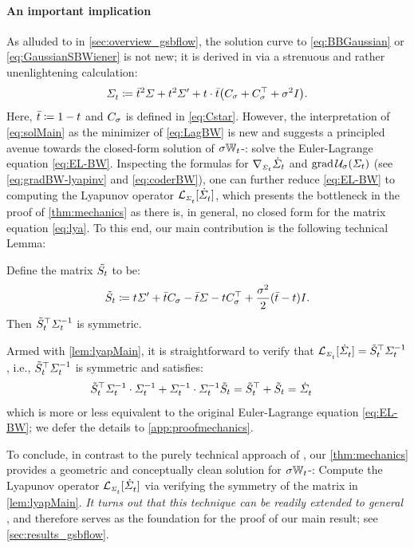 \paragraph{An important implication}As alluded to in \cref{sec:overview_gsbflow}, the solution curve to \eqref{eq:BBGaussian} or \eqref{eq:GaussianSBWiener} is not new; it is derived in \citet{mallasto2021entropy} via a strenuous and rather unenlightening calculation:
\begin{equation}
\label{eq:solMain}
\Sigmasol \defeq \ctimebar^2 \Sigma + \ctime^2 \Sigma' + \ctime\cdot\ctimebar\parens*{\C+\C^\top+ \sigma^2 \eye}.
\end{equation}
Here, $\bar{t} \coloneqq 1-t$ and $C_{\sigma}$ is defined in \eqref{eq:Cstar}. However, the interpretation of \eqref{eq:solMain} as the minimizer of \eqref{eq:LagBW} is new and suggests a principled avenue towards the closed-form solution of $\sigma\mathbb{W}_{t}$-: solve the Euler-Lagrange equation \eqref{eq:EL-BW}.
Inspecting the formulas for $\nabla_{\scriptscriptstyle\dot{\Sigma}_{t}}\dot{\Sigma}_{t}$ and $\gradBW \penergyBW$ (see \eqref{eq:gradBW-lyapinv} and \eqref{eq:coderBW}), one can further reduce \eqref{eq:EL-BW} to computing the Lyapunov operator $\lyap$, which presents the bottleneck in the proof of \cref{thm:mechanics} as there is, in general, no closed form for the matrix equation \eqref{eq:lya}. To this end, our main contribution is the following technical Lemma:
\begin{lemma}\label{lem:lyapMain}
Define the matrix $\tilde{S_{t}}$ to be:
\begin{equation}
\label{eq:HtMain}
\tilde{S}_{t} \coloneqq t\Sigma' + \bar{t} C_{\sigma} - \bar{t}\Sigma - tC_{\sigma}^\top + \frac{\sigma^2}{2}(\bar{t}-t)I.
\end{equation}Then $\tilde{S}_{t}^\top\Sigma^{-1}_{ t }$ is symmetric.
\end{lemma}
Armed with \cref{lem:lyapMain}, it is straightforward to verify that $\lyap = \Ht^\top\Sigmasolinv$, i.e., $\tilde{S}_{t}^\top \Sigma^{-1}_{ t }$ is symmetric and satisfies:
\begin{align}
   \tilde{S}_{t}^\top\Sigma^{-1}_{ t } \cdot \Sigma^{-1}_{ t } + \Sigma^{-1}_{ t } \cdot\Sigma^{-1}_{ t } \tilde{S}_{t} &= \tilde{S}_{t}^\top +  \tilde{S}_{t}= \dot{\Sigma}^{}_{ t }
\end{align}which is more or less equivalent to the original Euler-Lagrange equation \eqref{eq:EL-BW}; we defer the details to \cref{app:proofmechanics}.


To conclude, in contrast to the purely technical approach of \citet{mallasto2021entropy}, our \cref{thm:mechanics} provides a geometric and conceptually clean solution for $\sigma\mathbb{W}_{t}$-: Compute the Lyapunov operator $\lyap$ via verifying the symmetry of the matrix in \cref{lem:lyapMain}. \emph{It turns out that this technique can be readily extended to general }, and therefore serves as the foundation for the proof of our main result; see \cref{sec:results_gsbflow}.


